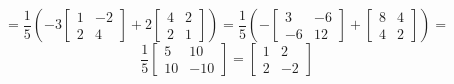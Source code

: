         \[
            =
            \frac{1}{5}
            \left(
                -3
                \begin{bmatrix}
                    1 & -2 \\
                    2 & 4
                \end{bmatrix}
                +
                2
                \begin{bmatrix}
                    4 & 2 \\
                    2 & 1
                \end{bmatrix}
            \right)
            =
            \frac{1}{5}
            \left(
                -
                \begin{bmatrix}
                    3 & -6 \\
                    -6 & 12
                \end{bmatrix}
                +
                \begin{bmatrix}
                    8 & 4 \\
                    4 & 2
                \end{bmatrix}
            \right)
            =
        \]
        \[
            \frac{1}{5}
            \begin{bmatrix}
                5 & 10 \\
                10 & -10
            \end{bmatrix}
            =
            \begin{bmatrix}
                1 & 2 \\
                2 & -2
            \end{bmatrix}
        \]